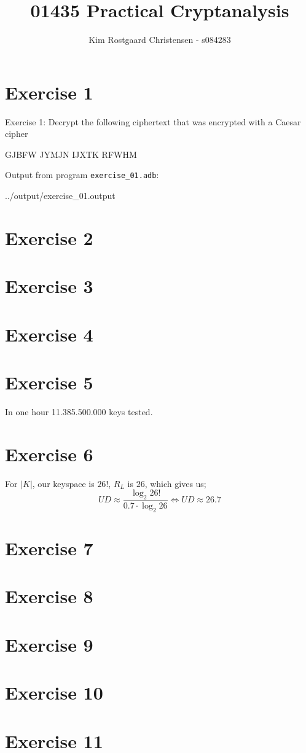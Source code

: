 \documentclass[10pt,a4paper]{article}
\title{01435 Practical Cryptanalysis}
\author{Kim Rostgaard Christensen - s084283}
\def\Code#1{\texttt{#1}}
\begin{document}
\maketitle

\section*{Exercise 1}
Exercise 1: Decrypt the following ciphertext that was encrypted with a Caesar cipher\\

\begin{center}
GJBFW JYMJN IJXTK RFWHM
\end{center}
Output from program \Code{exercise\_01.adb}:

 {../output/exercise_01.output}

\section*{Exercise 2}
\section*{Exercise 3}
\section*{Exercise 4}
\section*{Exercise 5}
In one hour 11.385.500.000 keys tested.
\section*{Exercise 6}
For $|K|$, our keyspace is $26!$, $R_L$ is $26$, which gives us;
\begin{equation}
UD \approx \frac{\log_2{26!}}{0.7 \cdot \log_2{26}} \Leftrightarrow UD \approx 26.7
\end{equation}

\section*{Exercise 7}
\section*{Exercise 8}
\section*{Exercise 9}
\section*{Exercise 10}
\section*{Exercise 11}
\end{document}
